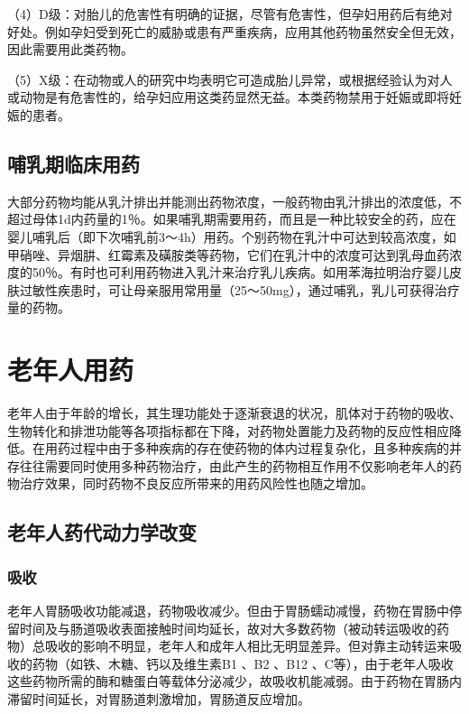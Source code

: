 （4）D级：对胎儿的危害性有明确的证据，尽管有危害性，但孕妇用药后有绝对好处。例如孕妇受到死亡的威胁或患有严重疾病，应用其他药物虽然安全但无效，因此需要用此类药物。

（5）X级：在动物或人的研究中均表明它可造成胎儿异常，或根据经验认为对人或动物是有危害性的，给孕妇应用这类药显然无益。本类药物禁用于妊娠或即将妊娠的患者。

\subsection{哺乳期临床用药}

大部分药物均能从乳汁排出并能测出药物浓度，一般药物由乳汁排出的浓度低，不超过母体1d内药量的1％。如果哺乳期需要用药，而且是一种比较安全的药，应在婴儿哺乳后（即下次哺乳前3～4h）用药。个别药物在乳汁中可达到较高浓度，如甲硝唑、异烟肼、红霉素及磺胺类等药物，它们在乳汁中的浓度可达到乳母血药浓度的50％。有时也可利用药物进入乳汁来治疗乳儿疾病。如用苯海拉明治疗婴儿皮肤过敏性疾患时，可让母亲服用常用量（25～50mg），通过哺乳，乳儿可获得治疗量的药物。

\section{老年人用药}

老年人由于年龄的增长，其生理功能处于逐渐衰退的状况，肌体对于药物的吸收、生物转化和排泄功能等各项指标都在下降，对药物处置能力及药物的反应性相应降低。在用药过程中由于多种疾病的存在使药物的体内过程复杂化，且多种疾病的并存往往需要同时使用多种药物治疗，由此产生的药物相互作用不仅影响老年人的药物治疗效果，同时药物不良反应所带来的用药风险性也随之增加。

\subsection{老年人药代动力学改变}

\subsubsection{吸收}

老年人胃肠吸收功能减退，药物吸收减少。但由于胃肠蠕动减慢，药物在胃肠中停留时间及与肠道吸收表面接触时间均延长，故对大多数药物（被动转运吸收的药物）总吸收的影响不明显，老年人和成年人相比无明显差异。但对靠主动转运来吸收的药物（如铁、木糖、钙以及维生素B{1}
、B{2} 、B{12}
、C等），由于老年人吸收这些药物所需的酶和糖蛋白等载体分泌减少，故吸收机能减弱。由于药物在胃肠内滞留时间延长，对胃肠道刺激增加，胃肠道反应增加。

